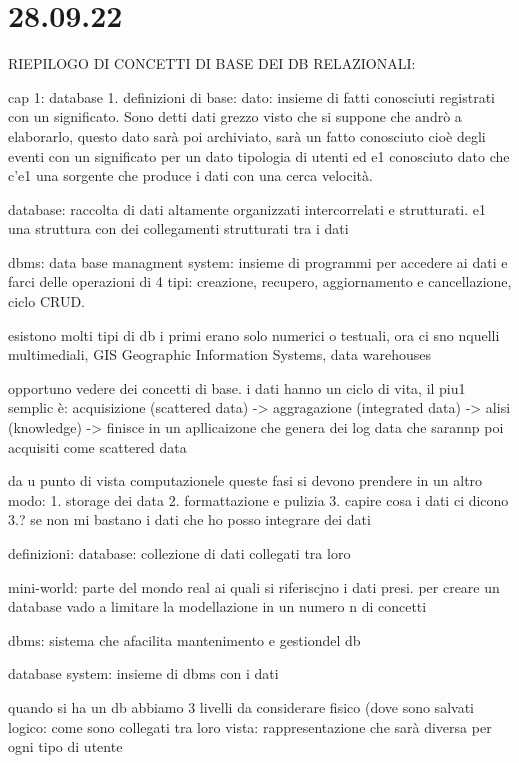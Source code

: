 
\section{28.09.22}

RIEPILOGO DI CONCETTI DI BASE DEI DB RELAZIONALI:

cap 1: database
1. definizioni di base:
dato: insieme di fatti conosciuti registrati con un significato. Sono detti dati grezzo visto che si suppone che andrò a elaborarlo, questo dato sarà poi archiviato, sarà un fatto conosciuto cioè degli eventi con un significato per un dato tipologia di utenti ed e1 conosciuto dato che c'e1 una sorgente che produce i dati con una cerca velocità.

database: raccolta di dati altamente organizzati intercorrelati e strutturati. e1 una struttura con dei collegamenti strutturati tra i dati

dbms: data base managment system: insieme di programmi per accedere ai dati e farci delle operazioni di 4 tipi: creazione, recupero, aggiornamento e cancellazione, ciclo CRUD.

esistono molti tipi di db i primi erano solo numerici o testuali, ora ci sno nquelli multimediali, GIS Geographic Information Systems, data warehouses

opportuno vedere dei concetti di base. i dati hanno un ciclo di vita, il piu1 semplic è:
acquisizione (scattered data) -> aggragazione (integrated data) -> alisi (knowledge) -> finisce in un apllicaizone che genera dei log data che sarannp poi acquisiti come scattered data

da u punto di vista computazionele queste fasi si devono prendere in un altro modo:
1. storage dei data
2. formattazione e pulizia
3. capire cosa i dati ci dicono 
3.? se non mi bastano i dati che ho posso integrare dei dati 

definizioni:
database: collezione di dati collegati tra loro

mini-world: parte del mondo real ai quali si riferiscjno i dati presi. per creare un database vado a limitare la modellazione in un numero n di concetti

dbms: sistema che afacilita mantenimento e gestiondel db

database system: insieme di dbms con i dati


quando si ha un db abbiamo 3 livelli da considerare
fisico (dove sono salvati
logico: come sono collegati tra loro
vista: rappresentazione che sarà diversa per ogni tipo di utente


